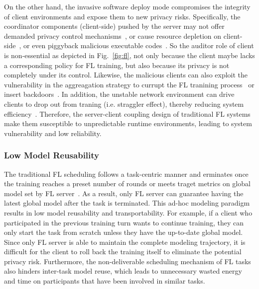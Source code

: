 On the other hand, the invasive software deploy mode compromises the integrity of client environments and expose them to new privacy risks.
Specifically, the coordinator components (client-side) pushed by the server may not offer demanded privacy control mechanisms~\cite{zeng2021fedlab, caldas2018leaf, mcmahan2017communication}, or cause resource depletion on client-side~\cite{bonawitz2019towards, niu2020billion, chen2020deep}, or even piggyback malicious executable codes~\cite{li2017understanding}.
So the auditor role of client is non-essential as depicted in Fig.~\ref{fig:fl}, not only because the client maybe lacks a corresponding policy for FL training, but also because its privacy is not completely under its control.
Likewise, the malicious clients can also exploit the vulnerability in the aggreagation strategy to currupt the FL tranining process~\cite{bouacida2021vulnerabilities, sattler2020byzantine, park2021sageflow, fang2020local} or insert backdoors~\cite{bagdasaryan2020backdoor, wang2020attack}.
In addition, the unstable network environment can drive clients to drop out from traning (i.e. straggler effect), thereby reducing system efficiency~\cite{reisizadeh2019robust, park2021sageflow}.
Therefore, the server-client coupling design of traditional FL systems make them susceptible to unpredictable runtime environments, leading to system vulnerability and low reliability.

\subsubsection{Low Model Reusability} %
The traditional FL scheduling follows a task-centric manner and erminates once the training reaches a preset number of rounds or meets traget metrics on global model set by FL server~\cite{bonawitz2019towards}.
As a result, only FL server can guarantee having the latest global model after the task is terminated.
This ad-hoc modeling paradigm results in low model reusability and transportability.
For example, if a client who participated in the previous training turn wants to continue training, they can only start the task from scratch unless they have the up-to-date global model.
Since only FL server is able to maintain the complete modeling trajectory, it is difficult for the client to roll back the training itself to eliminate the potential privacy risk.
Furthermore, the non-deliverable scheduling mechanism of FL tasks also hinders inter-task model reuse, which leads to unnecessary wasted energy and time on participants that have been involved in similar tasks.

